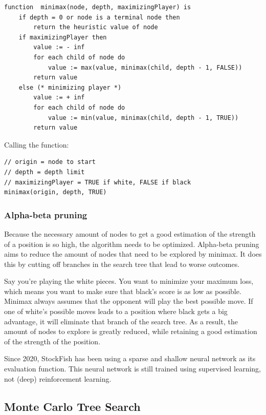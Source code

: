 \documentclass{article}
\begin{document}
\begin{verbatim}
function  minimax(node, depth, maximizingPlayer) is
    if depth = 0 or node is a terminal node then
        return the heuristic value of node
    if maximizingPlayer then
        value := - inf
        for each child of node do
            value := max(value, minimax(child, depth - 1, FALSE))
        return value
    else (* minimizing player *)
        value := + inf
        for each child of node do
            value := min(value, minimax(child, depth - 1, TRUE))
        return value
\end{verbatim}

Calling the function:

\begin{verbatim}
// origin = node to start
// depth = depth limit
// maximizingPlayer = TRUE if white, FALSE if black
minimax(origin, depth, TRUE)
\end{verbatim}

\subsubsection{Alpha-beta pruning}

Because the necessary amount of nodes to get a good estimation of the strength of a position
is so high, the algorithm needs to be optimized. 
Alpha-beta pruning \cite{AlphaBetaPruning2022} aims to reduce the amount of nodes that need to be explored by minimax.
It does this by cutting off branches in the search tree that lead to worse outcomes.

Say you're playing the white pieces. You want to minimize your maximum loss, which means 
you want to make sure that black's score is as low as possible. 
Minimax always assumes that the opponent will play the best possible move. If one of white's possible moves
leads to a position where black gets a big advantage, it will eliminate that branch of the search tree.
As a result, the amount of nodes to explore is greatly reduced, while retaining a good estimation 
of the strength of the position.

Since 2020, StockFish has been using a sparse and shallow neural network as its evaluation function. 
This neural network is still trained using supervised learning, not (deep) reinforcement learning.

\subsection{Monte Carlo Tree Search}
\end{document}

